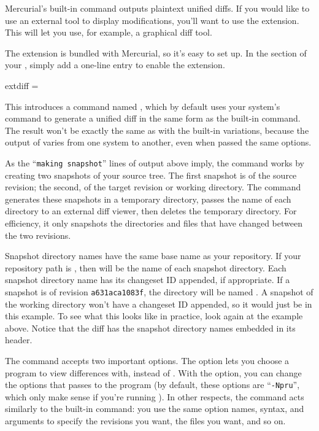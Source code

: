 Mercurial's built-in  command outputs plaintext unified
diffs.
If you would like to use an external tool to display modifications,
you'll want to use the  extension.  This will let you
use, for example, a graphical diff tool.

The  extension is bundled with Mercurial, so it's easy
to set up.  In the  section of your \hgrc,
simply add a one-line entry to enable the extension.
\begin{codesample2}
  [extensions]
  extdiff =
\end{codesample2}
This introduces a command named , which by
default uses your system's  command to generate a
unified diff in the same form as the built-in  command.
The result won't be exactly the same as with the built-in 
variations, because the output of  varies from one
system to another, even when passed the same options.

As the ``\texttt{making snapshot}'' lines of output above imply, the
 command works by creating two snapshots of
your source tree.  The first snapshot is of the source revision; the
second, of the target revision or working directory.  The
 command generates these snapshots in a
temporary directory, passes the name of each directory to an external
diff viewer, then deletes the temporary directory.  For efficiency, it
only snapshots the directories and files that have changed between the
two revisions.

Snapshot directory names have the same base name as your repository.
If your repository path is , then 
will be the name of each snapshot directory.  Each snapshot directory
name has its changeset ID appended, if appropriate.  If a snapshot is
of revision \texttt{a631aca1083f}, the directory will be named
.  A snapshot of the working directory won't
have a changeset ID appended, so it would just be  in
this example.  To see what this looks like in practice, look again at
the  example above.  Notice that the diff has
the snapshot directory names embedded in its header.

The  command accepts two important options.
The  option lets you choose a program to
view differences with, instead of .  With the
 option, you can change the options that
 passes to the program (by default, these
options are ``\texttt{-Npru}'', which only make sense if you're
running ).  In other respects, the
 command acts similarly to the built-in
 command: you use the same option names, syntax, and
arguments to specify the revisions you want, the files you want, and
so on.

